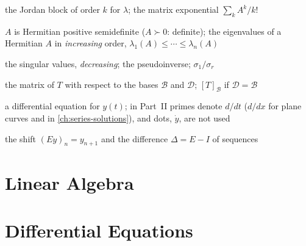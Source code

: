 \documentclass{sdbook-eng}
\begin{document}
\begin{symbols}
\item[$J_k(\lambda)$, $e^A$] the Jordan block of order $k$ for $\lambda$; the matrix exponential $\sum_kA^k/k!$
\item[$A\succeq0$, $\lambda_k(A)$] $A$ is Hermitian positive semidefinite ($A\succ0$: definite); the eigenvalues of a Hermitian $A$ in \emph{increasing} order, $\lambda_1(A)\le\cdots\le\lambda_n(A)$
\item[$\sigma_i(A)$, $A^+$, $\kappa_2(A)$] the singular values, \emph{decreasing}; the pseudoinverse; $\sigma_1/\sigma_r$
\item[{$[T]_{\mathcal D\leftarrow\mathcal B}$}] the matrix of $T$ with respect to the bases $\mathcal B$ and $\mathcal D$; $[T]_{\mathcal B}$ if $\mathcal D=\mathcal B$
\end{symbols}

\begin{symbols}
\item[$y'=f(t,y)$] a differential equation for $y(t)$; in Part~II primes denote $d/dt$ ($d/dx$ for plane curves and in \cref{ch:series-solutions}), and dots, $\dot y$, are not used
\item[$E$, $\Delta$] the shift $(Ey)_n=y_{n+1}$ and the difference $\Delta=E-I$ of sequences
\end{symbols}

\mainmatter
\part{Linear Algebra}











\part{Differential Equations}






\backmatter
\end{document}
